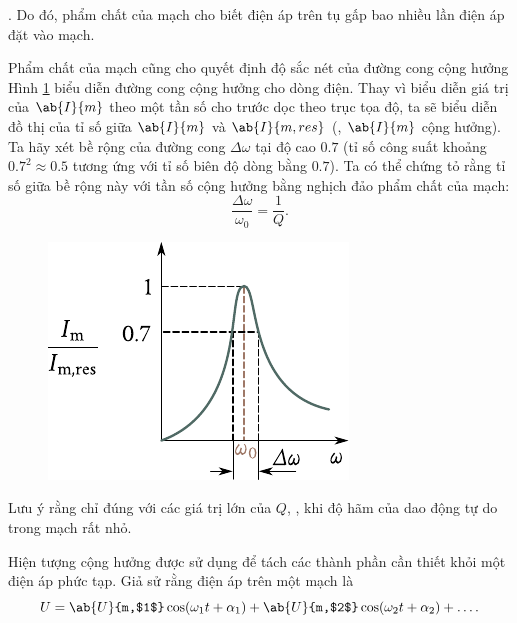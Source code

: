 \noindent
[ta đã giả thiết \eqn{13_38} rằng $\omega=\ab{\omega}{$U$,res}=\omega_0$.
Tại đây $Q$ là phẩm chất của mạch [xem \eqn{13_22}].
Do đó, phẩm chất của mạch cho biết điện áp trên tụ gấp bao nhiều lần điện áp đặt vào mạch.

Phẩm chất của mạch cũng cho quyết định độ sắc nét của đường cong cộng hưởng
Hình \ref{fig:13_9} biểu diễn đường cong cộng hưởng
cho dòng điện.
Thay vì biểu diễn giá trị của $\ab{I}{m}$ theo một tần số cho trước dọc theo trục tọa độ, ta sẽ biểu diễn đồ thị của tỉ số giữa $\ab{I}{m}$ và $\ab{I}{m,res}$ (\ie, $\ab{I}{m}$ cộng hưởng).
Ta hãy xét bề rộng của đường cong $\Delta{\omega}$ tại độ cao $0.7$ (tỉ số công suất khoảng $0.7^2\approx 0.5$ tương ứng với tỉ số biên độ dòng bằng $0.7$).
Ta có thể chứng tỏ rằng tỉ số giữa bề rộng này với tần số cộng hưởng bằng nghịch đảo phẩm chất của mạch:
\begin{equation}\label{eq:13_44}
    \frac{\Delta{\omega}}{\omega_0} = \frac{1}{Q}.
\end{equation}

\begin{figure}[t]
	\begin{center}
		\includegraphics[scale=1]{figures/ch_13/fig_13_9.pdf}
		\caption[]{}
		\label{fig:13_9}
	\end{center}
	\vspace{-0.8cm}
\end{figure}

Lưu ý rằng  chỉ đúng với các giá trị lớn của $Q$, \ie, khi độ hãm của dao động tự do trong mạch rất nhỏ.

Hiện tượng cộng hưởng được sử dụng để tách các thành phần cần thiết khỏi một điện áp phức tạp.
Giả sử rằng điện áp trên một mạch là
\begin{equation*}
    U = \ab{U}{m,$1$} \cos(\omega_1 t + \alpha_1) + \ab{U}{m,$2$} \cos(\omega_2 t + \alpha_2) + \ldots.
\end{equation*}

